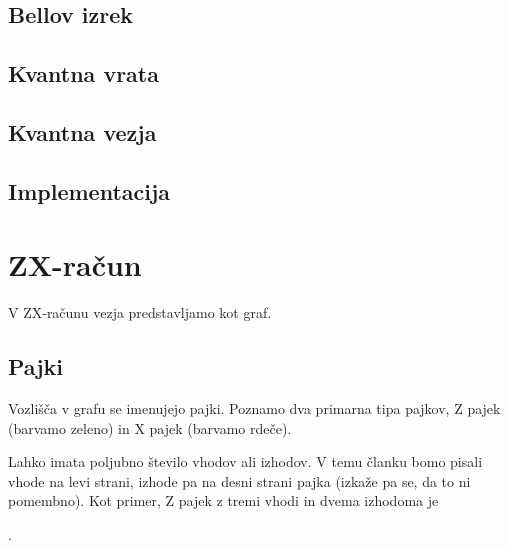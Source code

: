 \documentclass[mat1]{fmfdelo}
\begin{document}
\subsection{Bellov izrek}
\subsection{Kvantna vrata}
\subsection{Kvantna vezja}
\subsection{Implementacija}


\section{ZX-račun}
V ZX-računu vezja predstavljamo kot graf.
\subsection{Pajki}
Vozlišča v grafu se imenujejo pajki. Poznamo dva primarna tipa pajkov, Z pajek (barvamo zeleno) in X pajek (barvamo rdeče).


Lahko imata poljubno število vhodov ali izhodov. V temu članku bomo pisali vhode na levi strani, izhode pa na desni strani pajka (izkaže pa se, da to ni pomembno). Kot primer, Z pajek z tremi vhodi in dvema izhodoma je

\begin{center}
  .
\end{center}
\end{document}
